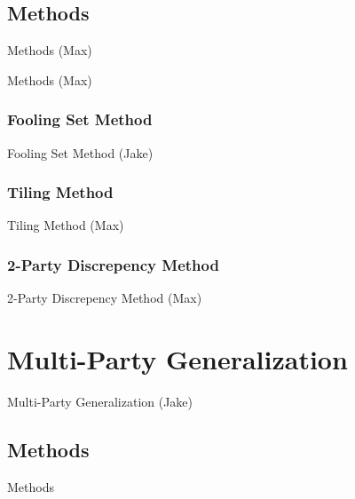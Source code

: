 \documentclass{beamer}
\begin{document}
\subsection{Methods}

\begin{frame}{Methods (Max)}

\end{frame}

\begin{frame}{Methods (Max)}
\tableofcontents[currentsection]
\end{frame}

\subsubsection{Fooling Set Method}

\begin{frame}{Fooling Set Method (Jake)}
\TODO
\end{frame}

\subsubsection{Tiling Method}

\begin{frame}{Tiling Method (Max)}
\TODO
\end{frame}

\subsubsection{2-Party Discrepency Method}

\begin{frame}{2-Party Discrepency Method (Max)}
\TODO
\end{frame}

\section{Multi-Party Generalization}

\begin{frame}{Multi-Party Generalization (Jake)}
\TODO
\end{frame}

\subsection{Methods}

\begin{frame}{Methods}
\TODO
\tableofcontents[currentsection]
\end{frame}
\end{document}
